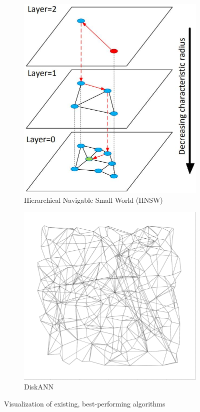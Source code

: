 \begin{figure}[ht]
    \centering
    \hfill
    \begin{subfigure}{0.45\textwidth}
        \centering
        \includegraphics[height=0.2\textheight]{images/hnsw}
        \caption{Hierarchical Navigable Small World (HNSW)}
        \label{fig:hnsw-viz}
    \end{subfigure}
    \hfill
    \begin{subfigure}{0.45\textwidth}
        \centering
        \includegraphics[height=0.2\textheight]{images/diskann}
        \caption{DiskANN}
        \label{fig:diskann-viz}
    \end{subfigure}
    \hfill
    \caption{Visualization of existing, best-performing algorithms}
\end{figure}

